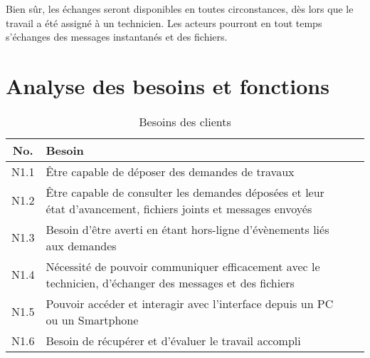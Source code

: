 \documentclass[
    iai, %
    eai, %
]{heig-tb}
\begin{document}

Bien sûr, les échanges seront disponibles en toutes circonstances, dès lors que le travail a été assigné à un technicien. Les acteurs pourront en tout temps s'échanges des messages instantanés et des fichiers.
\newpage

\section{Analyse des besoins et fonctions}

\begin{table}[h]
  \begin{center}
    \caption{Besoins des clients \label{specification}}
    \begin{tabularx}{\textwidth}{cXc}
      No.  & Besoin                                                                                                         \\ \toprule
      N1.1 & Être capable de déposer des demandes de travaux                                                                \\ \midrule
      N1.2 & Être capable de consulter les demandes déposées et leur état d'avancement, fichiers joints et messages envoyés \\ \midrule
      N1.3 & Besoin d'être averti en étant hors-ligne d'évènements liés aux demandes                                        \\ \midrule
      N1.4 & Nécessité de pouvoir communiquer efficacement avec le technicien, d'échanger des messages et des fichiers      \\ \midrule
      N1.5 & Pouvoir accéder et interagir avec l'interface depuis un PC ou un Smartphone                                    \\ \midrule
      N1.6 & Besoin de récupérer et d'évaluer le travail accompli                                                           \\ \midrule
    \end{tabularx}
  \end{center}
\end{table}
\end{document}
